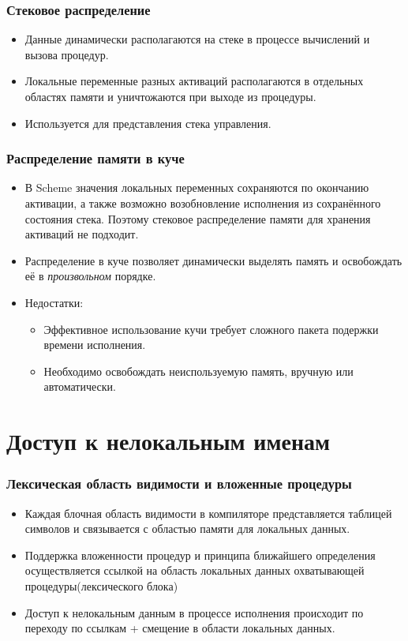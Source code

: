 \documentclass[16pt,pdf,unicode]{beamer}
\begin{document}
\begin{frame}
\frametitle{Стековое распределение}
\begin{itemize}
  \item Данные динамически располагаются на стеке в процессе вычислений и вызова процедур.
  \item Локальные переменные разных активаций располагаются в отдельных областях памяти и уничтожаются при выходе из процедуры.
  \item Используется для представления стека управления.
\end{itemize}
\end{frame}

\begin{frame}
\frametitle{Распределение памяти в куче}
\begin{itemize}
  \item В Scheme значения локальных переменных сохраняются по окончанию активации, а также возможно возобновление исполнения из сохранённого состояния стека. Поэтому стековое распределение памяти для хранения активаций не подходит.
  \item Распределение в куче позволяет динамически выделять память и освобождать её в \textit{произвольном} порядке.
  \item Недостатки:
  \begin{itemize}
    \item Эффективное использование кучи требует сложного пакета подержки времени исполнения.
    \item Необходимо освобождать неиспользуемую память, вручную или автоматически.
  \end{itemize}
\end{itemize}
\end{frame}

\section{Доступ к нелокальным именам}
\begin{frame}
\frametitle{Лексическая область видимости и вложенные процедуры}
\begin{itemize}
  \item Каждая блочная область видимости в компиляторе представляется таблицей символов и связывается с областью памяти для локальных данных.
  \item Поддержка вложенности процедур и принципа ближайшего определения осуществляется ссылкой на область локальных данных охватывающей процедуры(лексического блока)
  \item Доступ к нелокальным данным в процессе исполнения происходит по переходу по ссылкам + смещение в области локальных данных.
\end{itemize}
\end{frame}
\end{document}
